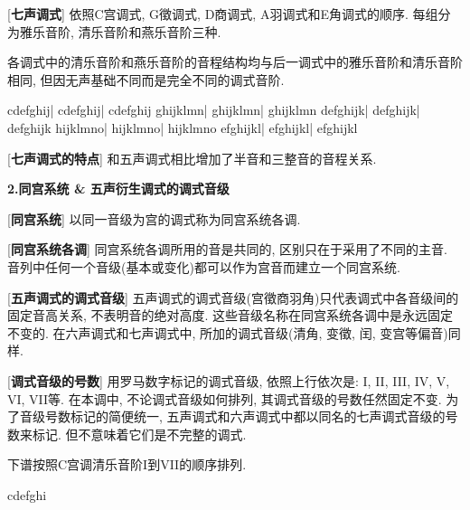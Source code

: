 \clearpage

[\textbf{七声调式}] 依照C宫调式, G徵调式, D商调式, A羽调式和E角调式的顺序. 每组分为雅乐音阶, 清乐音阶和燕乐音阶三种.\par
\qquad 各调式中的清乐音阶和燕乐音阶的音程结构均与后一调式中的雅乐音阶和清乐音阶相同, 但因无声基础不同而是完全不同的调式音阶.\par
\startextract
\Notes \wh c\wh d\wh e\wh f\wh g\wh h\wh i\wh j\en\bar
\Notes \wh c\wh d\wh e\wh f\wh g\wh h\wh i\wh j\en\bar
\Notes \wh c\wh d\wh e\wh f\wh g\wh h\wh i\wh j\en
\zendextract
\startextract{}
\Notes \wh g\wh h\wh i\wh j\wh k\wh l\wh m\wh n\en\bar
\Notes \wh g\wh h\wh i\wh j\wh k\wh l\wh m\wh n\en\bar
\Notes \wh g\wh h\wh i\wh j\wh k\wh l\wh m\wh n\en
\zendextract
\startextract{}
\Notes \wh d\wh e\wh f\wh g\wh h\wh i\wh j\wh k\en\bar
\Notes \wh d\wh e\wh f\wh g\wh h\wh i\wh j\wh k\en\bar
\Notes \wh d\wh e\wh f\wh g\wh h\wh i\wh j\wh k\en
\zendextract
\startextract{}
\Notes \wh h\wh i\wh j\wh k\wh l\wh m\wh n\wh o\en\bar
\Notes \wh h\wh i\wh j\wh k\wh l\wh m\wh n\wh o\en\bar
\Notes \wh h\wh i\wh j\wh k\wh l\wh m\wh n\wh o\en
\zendextract
\startextract{}
\Notes \wh e\wh f\wh g\wh h\wh i\wh j\wh k\wh l\en\bar
\Notes \wh e\wh f\wh g\wh h\wh i\wh j\wh k\wh l\en\bar
\Notes \wh e\wh f\wh g\wh h\wh i\wh j\wh k\wh l\en
\zendextract

[\textbf{七声调式的特点}] 和五声调式相比增加了半音和三整音的音程关系.\par

\begin{center}
 \textbf{2.同宫系统 \& 五声衍生调式的调式音级}\\
\end{center}

[\textbf{同宫系统}] 以同一音级为宫的调式称为同宫系统各调.\par

[\textbf{同宫系统各调}] 同宫系统各调所用的音是共同的, 区别只在于采用了不同的主音. 音列中任何一个音级(基本或变化)都可以作为宫音而建立一个同宫系统. \par

[\textbf{五声调式的调式音级}] 五声调式的调式音级(宫徵商羽角)只代表调式中各音级间的固定音高关系, 不表明音的绝对高度. 这些音级名称在同宫系统各调中是永远固定不变的. 在六声调式和七声调式中, 所加的调式音级(清角, 变徵, 闰, 变宫等偏音)同样.\par

[\textbf{调式音级的号数}] 用罗马数字标记的调式音级, 依照上行依次是: I, II, III, IV, V, VI, VII等. 在本调中, 不论调式音级如何排列, 其调式音级的号数任然固定不变. 为了音级号数标记的简便统一, 五声调式和六声调式中都以同名的七声调式音级的号数来标记. 但不意味着它们是不完整的调式.\par
\qquad 下谱按照C宫调清乐音阶I到VII的顺序排列.\par
\startextract
\Notes \wh c\wh d\wh e\wh f\wh g\wh h\wh i\en
\zendextract

